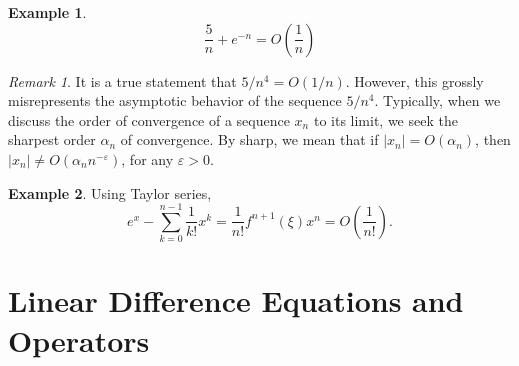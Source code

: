 \documentclass[12pt]{article}
\newcommand{\ee}{\varepsilon}
\theoremstyle{plain}
\theoremstyle{definition}
\newtheorem*{example}{Example}
\theoremstyle{remark}
\newtheorem*{remark}{Remark}
\numberwithin{equation}{section}  %
\begin{document}
\begin{example}
\begin{equation*}
\frac{5}{n} + e^{-n} = O\left( \frac{1}{n}\right)
\end{equation*}
\end{example}

\begin{remark}
It is a true statement that $5/n^4 = O(1/n)$. However, this grossly
misrepresents the asymptotic behavior of the sequence $5/n^4$. Typically, when
we discuss the order of convergence of a sequence $x_n$ to its limit, we seek
the sharpest order $\alpha_n$ of convergence. By sharp, we mean that if $|x_n| =
O(\alpha_n)$, then $|x_n| \neq O(\alpha_n n^{-\ee})$, for any $\ee > 0$.
\end{remark}

\begin{example}
Using Taylor series,
\begin{equation*}
e^x - \sum_{k = 0}^{n-1} \frac{1}{k!}x^k = \frac{1}{n!} f^{n+1}(\xi)x^n =
O\left(\frac{1}{n!}\right).
\end{equation*}
\end{example}

\section{Linear Difference Equations and Operators}
\end{document}
